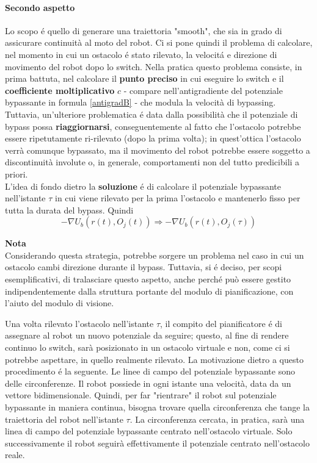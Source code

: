\documentclass[14pt,a4paper]{extarticle}
\begin{document}
\paragraph{Secondo aspetto}
Lo scopo é quello di generare una traiettoria "smooth", che sia in grado di assicurare continuità al moto del robot. Ci si pone quindi il problema di calcolare, nel momento in cui un ostacolo é stato rilevato, la velocitá e direzione di movimento del robot dopo lo switch. Nella pratica questo problema consiste, in prima battuta, nel calcolare il \textbf{punto preciso} in cui eseguire lo switch e il \textbf{coefficiente moltiplicativo} \(c\) - compare nell'antigradiente del potenziale bypassante in formula \ref{antigradB} - che modula la velocità di bypassing. Tuttavia, un'ulteriore problematica é data dalla possibilità che il potenziale di bypass possa \textbf{riaggiornarsi}, conseguentemente al fatto che l'ostacolo potrebbe essere ripetutamente ri-rilevato (dopo la prima volta); in quest'ottica l'ostacolo verrà comunque bypassato, ma il movimento del robot potrebbe essere soggetto a discontinuità involute o, in generale, comportamenti non del tutto predicibili a priori. \\
L'idea di fondo dietro la \textbf{soluzione} é di calcolare il potenziale bypassante nell'istante \(\tau\) in cui viene rilevato per la prima l'ostacolo e mantenerlo fisso per tutta la durata del bypass. Quindi \[-\nabla U_b \left( r(t) , O_j(t) \right) \Rightarrow -\nabla U_b \left( r(t) , O_j(\tau) \right) \]
\begin{nota}
\textbf{Nota} \\ Considerando questa strategia, potrebbe sorgere un problema nel caso in cui un ostacolo cambi direzione durante il bypass. Tuttavia, si é deciso, per scopi esemplificativi, di tralasciare questo aspetto, anche perché può essere gestito indipendentemente dalla struttura portante del modulo di pianificazione, con l'aiuto del modulo di visione.
\end{nota}
Una volta rilevato l'ostacolo nell'istante \(\tau\), il compito del pianificatore é di assegnare al robot un nuovo potenziale da seguire; questo, al fine di rendere continuo lo switch, sarà posizionato in un ostacolo virtuale e non, come ci si potrebbe aspettare, in quello realmente rilevato. La motivazione dietro a questo procedimento é la seguente. Le linee di campo del potenziale bypassante sono delle circonferenze. Il robot possiede in ogni istante una velocità, data da un vettore bidimensionale. Quindi, per far "rientrare" il robot sul potenziale bypassante in maniera continua, bisogna trovare quella circonferenza che tange la traiettoria del robot nell'istante \(\tau\). La circonferenza cercata, in pratica, sarà una linea di campo del potenziale bypassante centrato nell'ostacolo virtuale. Solo successivamente il robot seguirà effettivamente il potenziale centrato nell'ostacolo reale. 
\end{document}
